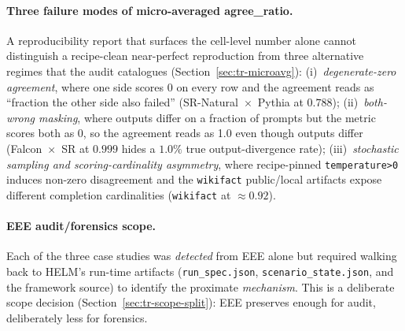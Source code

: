 \documentclass[11pt]{article}
\begin{document}
\paragraph{Three failure modes of micro-averaged agree\_ratio.}
A reproducibility report that surfaces the cell-level number alone
  cannot distinguish a recipe-clean near-perfect reproduction from
  three alternative regimes that the audit catalogues
  (Section~\ref{sec:tr-microavg}):
  (i)~\emph{degenerate-zero agreement}, where one side scores 0 on
  every row and the agreement reads as ``fraction the other side also
  failed'' (SR-Natural~$\times$~Pythia at $0.788$);
  (ii)~\emph{both-wrong masking}, where outputs differ on a fraction of
  prompts but the metric scores both as 0, so the agreement reads as
  1.0 even though outputs differ (Falcon~$\times$~SR at $0.999$ hides
  a $1.0\%$ true output-divergence rate);
  (iii)~\emph{stochastic sampling and scoring-cardinality asymmetry},
  where recipe-pinned \texttt{temperature>0} induces non-zero
  disagreement and the \texttt{wikifact} public/local artifacts expose
  different completion cardinalities
  (\texttt{wikifact} at $\approx 0.92$).

\paragraph{EEE audit/forensics scope.}
Each of the three case studies was \emph{detected} from EEE alone but
  required walking back to HELM's run-time artifacts
  (\texttt{run\_spec.json}, \texttt{scenario\_state.json}, and the
  framework source) to identify the proximate \emph{mechanism}.
This is a deliberate scope decision (Section~\ref{sec:tr-scope-split}):
  EEE preserves enough for audit, deliberately less for forensics.
\end{document}
